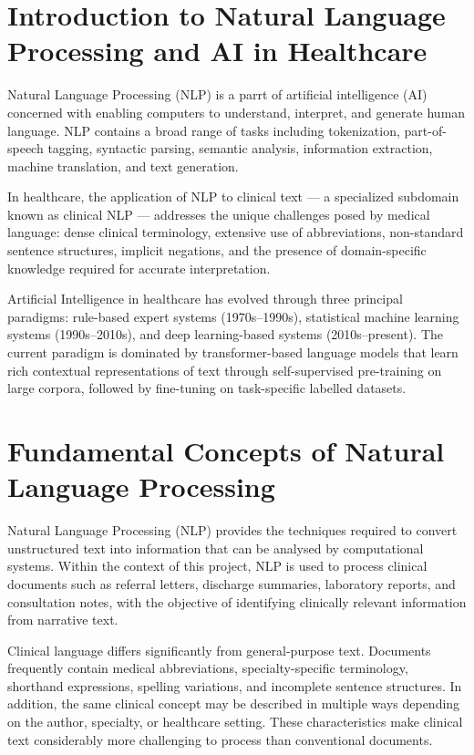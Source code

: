\section{Introduction to Natural Language Processing and AI in Healthcare}
Natural Language Processing (NLP) is a parrt of artificial intelligence (AI) concerned with enabling computers to understand, interpret, and generate human language. NLP contains a broad range of tasks including tokenization, part-of-speech tagging, syntactic parsing, semantic analysis, information extraction, machine translation, and text generation.

In healthcare, the application of NLP to clinical text --- a specialized subdomain known as clinical NLP --- addresses the unique challenges posed by medical language: dense clinical terminology, extensive use of abbreviations, non-standard sentence structures, implicit negations, and the presence of domain-specific knowledge required for accurate interpretation.

Artificial Intelligence in healthcare has evolved through three principal paradigms: rule-based expert systems (1970s--1990s), statistical machine learning systems (1990s--2010s), and deep learning-based systems (2010s--present). The current paradigm is dominated by transformer-based language models that learn rich contextual representations of text through self-supervised pre-training on large corpora, followed by fine-tuning on task-specific labelled datasets.

\section{Fundamental Concepts of Natural Language Processing}

Natural Language Processing (NLP) provides the techniques required to convert unstructured text into information that can be analysed by computational systems. Within the context of this project, NLP is used to process clinical documents such as referral letters, discharge summaries, laboratory reports, and consultation notes, with the objective of identifying clinically relevant information from narrative text.

Clinical language differs significantly from general-purpose text. Documents frequently contain medical abbreviations, specialty-specific terminology, shorthand expressions, spelling variations, and incomplete sentence structures. In addition, the same clinical concept may be described in multiple ways depending on the author, specialty, or healthcare setting. These characteristics make clinical text considerably more challenging to process than conventional documents.

